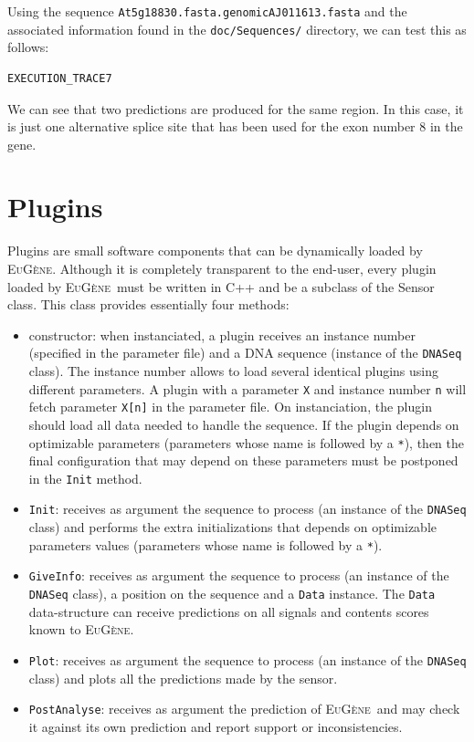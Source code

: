 \documentclass[a4paper,titlepage]{report}
\newcommand{\EuGene}{\textsc{EuG\`ene}}
\begin{document}
Using the sequence \texttt{At5g18830.fasta.genomicAJ011613.fasta} and the associated information found in
the \texttt{doc/Sequences/} directory, we can test this as follows:

\begin{Verbatim}[fontsize=\scriptsize]
EXECUTION_TRACE7
\end{Verbatim}

We can see that two predictions are produced for the same region. In this case, it is just one alternative splice site
that has been used for the exon number 8 in the gene.

\section{Plugins}
\label{plug}

Plugins are small software components that can be dynamically loaded
by \EuGene. Although it is completely transparent to the end-user,
every plugin loaded by \EuGene\ must be written in C++ and be a
subclass of the Sensor class. This class provides essentially four
methods:
\begin{itemize}
\item constructor: when instanciated, a plugin receives an instance number
  (specified in the parameter file) and a DNA sequence (instance of
  the \texttt{DNASeq} class). The instance number allows to load
  several identical plugins using different parameters. A plugin with
  a parameter \texttt{X} and instance number \texttt{n} will fetch
  parameter \texttt{X[n]} in the parameter file. On instanciation, the
  plugin should load all data needed to handle the sequence. If the
  plugin depends on optimizable parameters (parameters whose name is
  followed by a \texttt{*}), then the final configuration that may
  depend on these parameters must be postponed in the \texttt{Init}
  method. 
  
\item \texttt{Init}: receives as argument the sequence to process (an
  instance of the \texttt{DNASeq} class) and performs the extra
  initializations that depends on optimizable parameters values
  (parameters whose name is followed by a \texttt{*}).
  
\item \texttt{GiveInfo}: receives as argument the sequence to process
  (an instance of the \texttt{DNASeq} class), a position on the
  sequence and a \texttt{Data} instance. The \texttt{Data}
  data-structure can receive predictions on all signals and contents
  scores known to \EuGene.

\item \texttt{Plot}: receives as argument the sequence to process (an
  instance of the \texttt{DNASeq} class) and plots all the predictions
  made by the sensor.

\item \texttt{PostAnalyse}: receives as argument the prediction of
  \EuGene\ and may check it against its own prediction and report
  support or inconsistencies.
\end{itemize}
\end{document}
